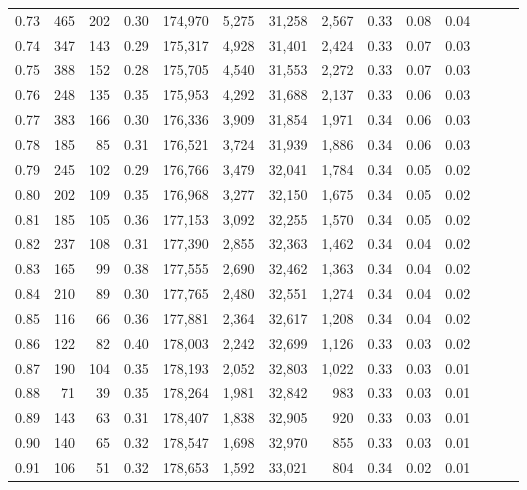 \begin{tabular}{rrrrrrrrrrrrrr}
0.73 &    465 &  202 &  0.30 &  174,970 &    5,275 &  31,258 &   2,567 &  0.33 &  0.08 &      0.04 \\
0.74 &    347 &  143 &  0.29 &  175,317 &    4,928 &  31,401 &   2,424 &  0.33 &  0.07 &      0.03 \\
0.75 &    388 &  152 &  0.28 &  175,705 &    4,540 &  31,553 &   2,272 &  0.33 &  0.07 &      0.03 \\
0.76 &    248 &  135 &  0.35 &  175,953 &    4,292 &  31,688 &   2,137 &  0.33 &  0.06 &      0.03 \\
0.77 &    383 &  166 &  0.30 &  176,336 &    3,909 &  31,854 &   1,971 &  0.34 &  0.06 &      0.03 \\
0.78 &    185 &   85 &  0.31 &  176,521 &    3,724 &  31,939 &   1,886 &  0.34 &  0.06 &      0.03 \\
0.79 &    245 &  102 &  0.29 &  176,766 &    3,479 &  32,041 &   1,784 &  0.34 &  0.05 &      0.02 \\
0.80 &    202 &  109 &  0.35 &  176,968 &    3,277 &  32,150 &   1,675 &  0.34 &  0.05 &      0.02 \\
0.81 &    185 &  105 &  0.36 &  177,153 &    3,092 &  32,255 &   1,570 &  0.34 &  0.05 &      0.02 \\
0.82 &    237 &  108 &  0.31 &  177,390 &    2,855 &  32,363 &   1,462 &  0.34 &  0.04 &      0.02 \\
0.83 &    165 &   99 &  0.38 &  177,555 &    2,690 &  32,462 &   1,363 &  0.34 &  0.04 &      0.02 \\
0.84 &    210 &   89 &  0.30 &  177,765 &    2,480 &  32,551 &   1,274 &  0.34 &  0.04 &      0.02 \\
0.85 &    116 &   66 &  0.36 &  177,881 &    2,364 &  32,617 &   1,208 &  0.34 &  0.04 &      0.02 \\
0.86 &    122 &   82 &  0.40 &  178,003 &    2,242 &  32,699 &   1,126 &  0.33 &  0.03 &      0.02 \\
0.87 &    190 &  104 &  0.35 &  178,193 &    2,052 &  32,803 &   1,022 &  0.33 &  0.03 &      0.01 \\
0.88 &     71 &   39 &  0.35 &  178,264 &    1,981 &  32,842 &     983 &  0.33 &  0.03 &      0.01 \\
0.89 &    143 &   63 &  0.31 &  178,407 &    1,838 &  32,905 &     920 &  0.33 &  0.03 &      0.01 \\
0.90 &    140 &   65 &  0.32 &  178,547 &    1,698 &  32,970 &     855 &  0.33 &  0.03 &      0.01 \\
0.91 &    106 &   51 &  0.32 &  178,653 &    1,592 &  33,021 &     804 &  0.34 &  0.02 &      0.01 \\

\end{tabular}
